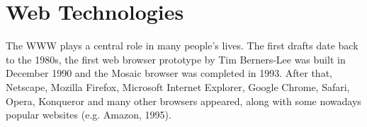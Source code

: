 








\section{Web Technologies}
The \ac{WWW} plays a central role in many people's lives.
The first drafts date back to the 1980s, the first web browser prototype by Tim Berners-Lee was built in December 1990 and the Mosaic browser was completed in 1993.
After that, Netscape, Mozilla Firefox, Microsoft Internet Explorer, Google Chrome, Safari, Opera, Konqueror and many other browsers appeared, along with some nowadays popular websites (e.g. Amazon, 1995).

